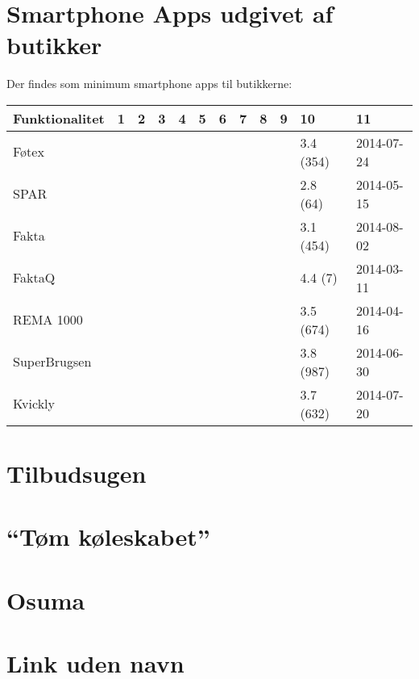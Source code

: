 \section{Smartphone Apps udgivet af butikker}
	Der findes som minimum smartphone apps til butikkerne: 
	\begin{table}
	    \begin{tabular}{l|lllllllllll}
	    Funktionalitet & 1 & 2 & 3 & 4 & 5 & 6 & 7 & 8 & 9 & 10 & 11 \\ \hline
	   	Føtex                       & \cmark   & \cmark    & \cmark  & \cmark   & \cmark  & ~      & ~       & ~          & ~                       & 3.4 (354)      & 2014-07-24       \\
	    SPAR                        & \cmark   & \cmark    & \cmark  & ~        & \cmark  & \cmark & ~       & ~          & ~                       & 2.8 (64)       & 2014-05-15       \\
	    Fakta                       & \cmark   & \cmark    & \cmark  & ~        & \cmark  & ~      & \cmark        & \cmark     & \cmark               & 3.1 (454)      & 2014-08-02       \\
	    FaktaQ                      & \cmark   & ~         & \cmark  & ~        & \cmark  & ~      & ~       & ~          & ~                       & 4.4 (7)        & 2014-03-11       \\
	    REMA 1000                   & \cmark   & \cmark    & \cmark  & ~        & \cmark  & ~      & ~       & ~          & ~                       & 3.5 (674)      & 2014-04-16       \\
	    SuperBrugsen                & \cmark   & \cmark    & \cmark  & ~        & \cmark  & ~      & ~       & ~          & ~                       & 3.8 (987)      & 2014-06-30       \\
	    Kvickly                     & \cmark   & \cmark    & \cmark  & ~        & \cmark  & ~      & ~       & ~          & ~                       & 3.7 (632)      & 2014-07-20       \\
	    \end{tabular}
	\end{table}

\section{Tilbudsugen}

\section{``Tøm køleskabet''}

\section{Osuma}

\section{Link uden navn}